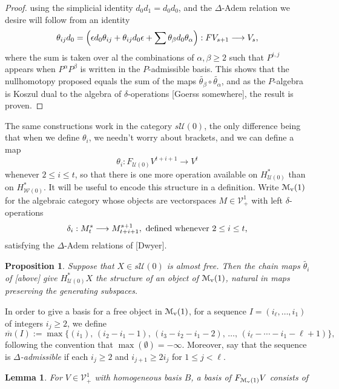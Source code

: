 \documentclass[11pt]{amsart}
\theoremstyle{plain}
\newtheorem{lem}[thm]{Lemma}
\newtheorem{prop}[thm]{Proposition}
\theoremstyle{definition}
\renewcommand{\to}{\longrightarrow}
\newcommand{\calW}{\mathcal{W}}
\newcommand{\calU}{\mathcal{U}}
\newcommand{\calV}{\mathcal{V}}
\newcommand{\calM}{\mathcal{M}}
\theoremstyle{plain}
\newcommand{\deltaalg}{\Delta} %
\newcommand{\vect}[2]{\calV^{#1}_{#2}}
\newcommand{\minDimP}{\overline{m}}
\begin{document}
\begin{Cohomology operations for all unstable Lie algebras}
\begin{proof}
using the simplicial identity $d_0d_1=d_0d_0$, and the $\deltaalg$-Adem relation we desire will follow from an identity
\[\theta_{ij}d_0=\Bigl(\epsilon d_0\theta_{ij}+\theta_{ij}d_0\epsilon+\sum\theta_\beta d_0\theta_\alpha\Bigr):FV_{s+1}\to V_s,\]
where the sum is taken over al the combinations of $\alpha,\beta\geq2$ such that $P^{i,j}$ appears when $P^\alpha P^\beta$ is written in the $P$-admissible basis. This shows that the nullhomotopy proposed equals the sum of the maps $\widetilde{\theta_\beta}\circ\widetilde{\theta_\alpha}$, and as the $P$-algebra is Koszul dual to the algebra of $\delta$-operations [Goerss somewhere], the result is proven.
\end{proof}
The same constructions work in the category $s\calU(0)$, the only difference being that when we define $\theta_i$, we needn't worry about brackets, and we can define a map
\[\theta_i:F_{\calU(0)}V^{t+i+1}\to V^t\]
whenever $2\leq i\leq t$, so that there is one more operation available on $H^*_{\calU(0)}$ than on $H^*_{\calW(0)}$. It will be useful to encode this structure in a definition. Write $\calM_\textup{v}(1)$ for the algebraic category whose objects are vectorspaces $M\in\vect{1}{+}$ with left $\delta$-operations
\[\delta_i:M^{s}_t\to M^{s+1}_{t+i+1},\textup{ defined whenever $2\leq i\leq t$,}\]
satisfying the $\deltaalg$-Adem relations of [Dwyer].
\begin{prop}\label{operations on untable P homology}
Suppose that $X\in s\calU(0)$ is almost free. Then the chain maps $\widetilde{\theta_i}$ of [above] give $H^*_{\calU(0)}X$ the structure of an object of $\calM_\textup{v}(1)$, natural in maps preserving the generating subspaces.
\end{prop}
In order to give a basis for a free object in $\calM_\textup{v}(1)$, for a sequence $I=(i_\ell,\ldots,i_1)$ of integers $i_j\geq2$, we define
\[\minDimP(I):=\max\{(i_1),\,(i_2-i_1-1),\,(i_3-i_2-i_1-2),\,\ldots,\,(i_{\ell}-\cdots-i_1-\ell+1)\},
\]
following the convention that $\max(\emptyset)=-\infty$. Moreover, say that the sequence is \emph{$\deltaalg$-admissible} if each $i_j\geq2$ and  $i_{j+1}\geq 2i_j$ for $1\leq j <\ell$.
\begin{lem}\label{basis of element of M(0)}
For $V\in\vect{1}{+}$ with homogeneous basis $B$, a basis of $F_{\calM_\textup{v}(1)}V$ consists of

\end{lem}
\end{Cohomology operations for all unstable Lie algebras}
\end{document}
